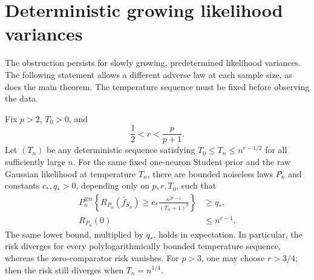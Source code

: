 \section{Deterministic growing likelihood variances}
\label{sec:raw-growing-temperature}
The obstruction persists for slowly growing, predetermined likelihood
variances. The following statement allows a different adverse law at
each sample size, as does the main theorem. The temperature sequence
must be fixed before observing the data.

\begin{corollary}
Fix $p>2$, $T_0>0$, and
\[
 \frac12<r<\frac p{p+1}.
\]
Let $(T_n)$ be any deterministic sequence satisfying
$T_0\le T_n\le n^{r-1/2}$ for all sufficiently large $n$.
For the same fixed one-neuron Student prior and the raw Gaussian
likelihood at temperature $T_n$, there are bounded noiseless laws
$P_n$ and constants $c_*,q_*>0$, depending only on $p,r,T_0$, such that
\[
 \begin{split}
 P_n^{\otimes n}\left\{R_{P_n}(\bar f_{S_n})
       \ge c_*\frac{n^{2r-1}}{(T_n+1)^2}\right\}&\ge q_*,\\
 R_{P_n}(0)&\le n^{r-1}.
 \end{split}
\]
The same lower bound, multiplied by $q_*$, holds in expectation.
In particular, the risk diverges for every polylogarithmically
bounded temperature sequence, whereas the zero-comparator risk
vanishes. For $p>3$, one may choose $r>3/4$; then the risk still
diverges when $T_n=n^{1/4}$.
\end{corollary}

